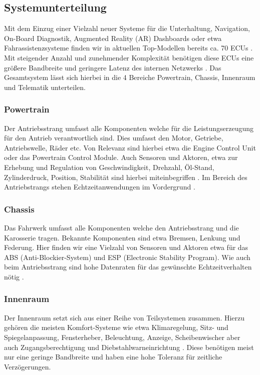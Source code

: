     \subsection{Systemunterteilung}
    Mit dem Einzug einer Vielzahl neuer Systeme für die Unterhaltung, Navigation, On-Board Diagnostik,
    Augmented Reality (AR) Dashboards oder etwa Fahrassistenzsysteme finden wir in aktuellen Top-Modellen bereits 
    ca. 70 ECUs \cite{TW_huang2018vehicle}. Mit steigender Anzahl und zunehmender Komplexität 
    benötigen diese ECUs eine größere Bandbreite und geringere Latenz des internen Netzwerks \cite{TW_huang2018vehicle}.
    Das Gesamtsystem lässt sich hierbei in die 4 Bereiche Powertrain, Chassis, Innenraum und Telematik unterteilen.
        \subsubsection{Powertrain}
        Der Antriebsstrang umfasst alle Komponenten welche für die Leistungserzeugung für den Antrieb verantwortlich sind. Dies umfasst 
        den Motor, Getriebe, Antriebswelle, Räder etc. Von Relevanz sind hierbei etwa die Engine Control Unit oder das Powertrain Control Module.
        Auch Sensoren und Aktoren, etwa zur Erhebung und Regulation von Geschwindigkeit, Drehzahl, Öl-Stand, Zylinderdruck, Position, Stabilität sind hierbei miteinbegriffen \cite{IVN}.
        Im Bereich des Antriebstrangs stehen Echtzeitanwendungen im Vordergrund \cite{reif2011bosch}\cite{TW_huang2018vehicle}.
        \subsubsection{Chassis}
        Das Fahrwerk umfasst alle Komponenten welche den Antriebsstrang und die Karosserie tragen. Bekannte Komponenten sind etwa
        Bremsen, Lenkung und Federung. Hier finden wir eine Vielzahl von Sensoren und Aktoren etwa für das ABS (Anti-Blockier-System) und ESP (Electronic Stability Program).
        Wie auch beim Antriebsstrang sind hohe Datenraten für das gewünschte Echtzeitverhalten nötig \cite{TW_huang2018vehicle}.
        \subsubsection{Innenraum}
        Der Innenraum setzt sich aus einer Reihe von Teilsystemen zusammen. Hierzu gehören die meisten Komfort-Systeme wie etwa Klimaregelung, Sitz- und Spiegelanpassung, Fensterheber, Beleuchtung,
        Anzeige, Scheibenwischer aber auch Zugangsberechtigung und Diebstahlwarneinrichtung \cite{reif2011bosch}. 
        Diese benötigen meist nur eine geringe Bandbreite und haben eine hohe Toleranz für zeitliche Verzögerungen.
